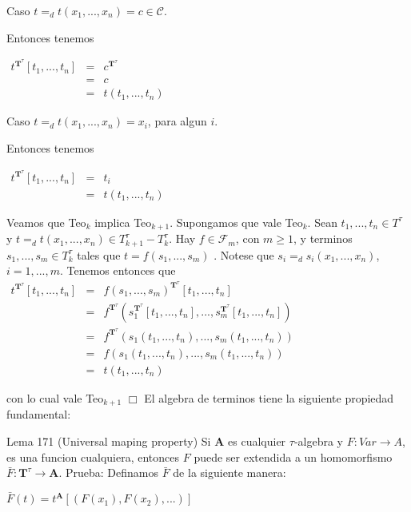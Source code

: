 Caso \(t=_{d}t(x_{1},...,x_{n})=c\in \mathcal{C}\).

Entonces tenemos

\(\displaystyle \begin{array}{cll} t^{\mathbf{T}^{\tau }}[t_{1},...,t_{n}] & = & c^{\mathbf{T}^{\tau }} \\ & = & c \\ & = & t(t_{1},...,t_{n}) \end{array} \)

Caso \(t=_{d}t(x_{1},...,x_{n})=x_{i}\), para algun \(i\).

Entonces tenemos

\(\displaystyle \begin{array}{cll} t^{\mathbf{T}^{\tau }}[t_{1},...,t_{n}] & = & t_{i} \\ & = & t(t_{1},...,t_{n}) \end{array} \)

Veamos que Teo\(_{k}\) implica Teo\(_{k+1}\). Supongamos que vale Teo\(_{k}\). Sean \(t_{1},...,t_{n}\in T^{\tau }\) y \(t=_{d}t(x_{1},...,x_{n})\in T_{k+1}^{\tau }-T_{k}^{\tau }\). Hay \(f\in \mathcal{F}_{m}\), con \(m\geq 1\), y terminos \(s_{1},...,s_{m}\in T_{k}^{\tau }\) tales que \(t=f(s_{1},...,s_{m})\) . Notese que \(s_{i}=_{d}s_{i}(x_{1},...,x_{n})\), \(i=1,...,m\). Tenemos entonces que
\(\displaystyle \begin{array}{lll} t^{\mathbf{T}^{\tau }}[t_{1},...,t_{n}] & = & f(s_{1},...,s_{m})^{\mathbf{T} ^{\tau }}[t_{1},...,t_{n}] \\ & = & f^{\mathbf{T}^{\tau }}(s_{1}^{\mathbf{T}^{\tau }}[t_{1},...,t_{n}],...,s_{m}^{\mathbf{T}^{\tau }}[t_{1},...,t_{n}]) \\ & = & f^{\mathbf{T}^{\tau }}(s_{1}(t_{1},...,t_{n}),...,s_{m}(t_{1},...,t_{n})) \\ & = & f(s_{1}(t_{1},...,t_{n}),...,s_{m}(t_{1},...,t_{n})) \\ & = & t(t_{1},...,t_{n}) \end{array} \)

con lo cual vale Teo\(_{k+1}\) \(\Box\)
El algebra de terminos tiene la siguiente propiedad fundamental:

Lema 171 (Universal maping property) Si \(\mathbf{A}\) es cualquier \(\tau \)-algebra y \( F:Var\rightarrow A\), es una funcion cualquiera, entonces \(F\) puede ser extendida a un homomorfismo \(\bar{F}:\mathbf{T}^{\tau }\rightarrow \mathbf{A} \).
Prueba: Definamos \(\bar{F}\) de la siguiente manera:

\(\displaystyle \bar{F}(t)=t^{\mathbf{A}}[(F(x_{1}),F(x_{2}),...)] \)

